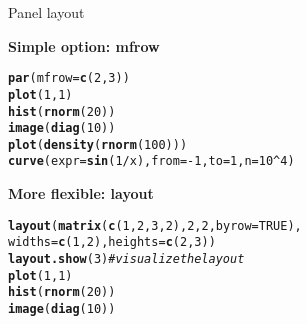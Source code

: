 \documentclass[10pt]{beamer}\usepackage[]{graphicx}\usepackage[]{color}
\makeatletter
\newcommand{\hlnum}[1]{\textcolor[rgb]{0.686,0.059,0.569}{#1}}%
\newcommand{\hlcom}[1]{\textcolor[rgb]{0.678,0.584,0.686}{\textit{#1}}}%
\newcommand{\hlopt}[1]{\textcolor[rgb]{0,0,0}{#1}}%
\newcommand{\hlstd}[1]{\textcolor[rgb]{0.345,0.345,0.345}{#1}}%
\newcommand{\hlkwc}[1]{\textcolor[rgb]{0.333,0.667,0.333}{#1}}%
\newcommand{\hlkwd}[1]{\textcolor[rgb]{0.737,0.353,0.396}{\textbf{#1}}}%
\newenvironment{kframe}{%
 \def\at@end@of@kframe{}%
 \ifinner\ifhmode%
  \def\at@end@of@kframe{\end{minipage}}%
  \begin{minipage}{\columnwidth}%
 \fi\fi%
 \def\FrameCommand##1{\hskip\@totalleftmargin \hskip-\fboxsep
 \colorbox{shadecolor}{##1}\hskip-\fboxsep
     \hskip-\linewidth \hskip-\@totalleftmargin \hskip\columnwidth}%
 \MakeFramed {\advance\hsize-\width
   \@totalleftmargin\z@ \linewidth\hsize
   \@setminipage}}%
 {\par\unskip\endMakeFramed%
 \at@end@of@kframe}
\newenvironment{knitrout}{}{} %
\makeatother
\begin{document}
\begin{frame}[fragile]{Panel layout}

\textbf{Simple option: mfrow}
\begin{knitrout}
\color{fgcolor}\begin{kframe}
\begin{alltt}
\hlkwd{par}\hlstd{(}\hlkwc{mfrow}\hlstd{=}\hlkwd{c}\hlstd{(}\hlnum{2}\hlstd{,}\hlnum{3}\hlstd{))}
\hlkwd{plot}\hlstd{(}\hlnum{1}\hlstd{,}\hlnum{1}\hlstd{)}
\hlkwd{hist}\hlstd{(}\hlkwd{rnorm}\hlstd{(}\hlnum{20}\hlstd{))}
\hlkwd{image}\hlstd{(}\hlkwd{diag}\hlstd{(}\hlnum{10}\hlstd{))}
\hlkwd{plot}\hlstd{(}\hlkwd{density}\hlstd{(}\hlkwd{rnorm}\hlstd{(}\hlnum{100}\hlstd{)))}
\hlkwd{curve}\hlstd{(}\hlkwc{expr} \hlstd{=} \hlkwd{sin}\hlstd{(}\hlnum{1}\hlopt{/}\hlstd{x),} \hlkwc{from} \hlstd{=} \hlopt{-}\hlnum{1}\hlstd{,} \hlkwc{to} \hlstd{=} \hlnum{1}\hlstd{,} \hlkwc{n} \hlstd{=} \hlnum{10}\hlopt{^}\hlnum{4}\hlstd{)}
\end{alltt}
\end{kframe}
\end{knitrout}

\pause

\textbf{More flexible: layout}
\begin{knitrout}
\color{fgcolor}\begin{kframe}
\begin{alltt}
\hlkwd{layout}\hlstd{(}\hlkwd{matrix}\hlstd{(}\hlkwd{c}\hlstd{(}\hlnum{1}\hlstd{,}\hlnum{2}\hlstd{,}\hlnum{3}\hlstd{,}\hlnum{2}\hlstd{),} \hlnum{2}\hlstd{,} \hlnum{2}\hlstd{,} \hlkwc{byrow} \hlstd{=} \hlnum{TRUE}\hlstd{),}
       \hlkwc{widths} \hlstd{=} \hlkwd{c}\hlstd{(}\hlnum{1}\hlstd{,}\hlnum{2}\hlstd{) ,} \hlkwc{heights} \hlstd{=} \hlkwd{c}\hlstd{(}\hlnum{2}\hlstd{,}\hlnum{3}\hlstd{))}
\hlkwd{layout.show}\hlstd{(}\hlnum{3}\hlstd{)} \hlcom{# visualize the layout}
\hlkwd{plot}\hlstd{(}\hlnum{1}\hlstd{,}\hlnum{1}\hlstd{)}
\hlkwd{hist}\hlstd{(}\hlkwd{rnorm}\hlstd{(}\hlnum{20}\hlstd{))}
\hlkwd{image}\hlstd{(}\hlkwd{diag}\hlstd{(}\hlnum{10}\hlstd{))}
\end{alltt}
\end{kframe}
\end{knitrout}

\end{frame}
\end{document}
